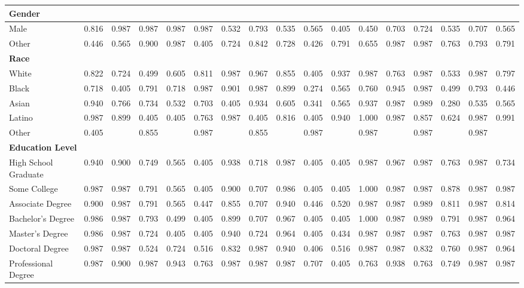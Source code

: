 \documentclass[11pt]{report}
\begin{document}
\begin{append}
\begin{landscape}
\begin{table}[h]
\begin{tabular}{@{\extracolsep{-4pt}}lcccccccccccccccc}
    \multicolumn{17}{l}{\textbf{Gender}} \\ 
    \midrule
    Male & 0.816 & 0.987 & 0.987 & 0.987 & 0.987 & 0.532 & 0.793 & 0.535 & 0.565 & 0.405 & 0.450 & 0.703 & 0.724 & 0.535 & 0.707 & 0.565 \\ 
    Other & 0.446 & 0.565 & 0.900 & 0.987 & 0.405 & 0.724 & 0.842 & 0.728 & 0.426 & 0.791 & 0.655 & 0.987 & 0.987 & 0.763 & 0.793 & 0.791 \\ 
    \midrule
    
    \multicolumn{17}{l}{\textbf{Race}} \\ 
    \midrule
    White & 0.822 & 0.724 & 0.499 & 0.605 & 0.811 & 0.987 & 0.967 & 0.855 & 0.405 & 0.937 & 0.987 & 0.763 & 0.987 & 0.533 & 0.987 & 0.797 \\ 
    Black & 0.718 & 0.405 & 0.791 & 0.718 & 0.987 & 0.901 & 0.987 & 0.899 & 0.274 & 0.565 & 0.760 & 0.945 & 0.987 & 0.499 & 0.793 & 0.446 \\ 
    Asian & 0.940 & 0.766 & 0.734 & 0.532 & 0.703 & 0.405 & 0.934 & 0.605 & 0.341 & 0.565 & 0.937 & 0.987 & 0.989 & 0.280 & 0.535 & 0.565 \\ 
    Latino & 0.987 & 0.899 & 0.405 & 0.405 & 0.763 & 0.987 & 0.405 & 0.816 & 0.405 & 0.940 & 1.000 & 0.987 & 0.857 & 0.624 & 0.987 & 0.991 \\ 
    Other & 0.405 &  & 0.855 &  & 0.987 &  & 0.855 &  & 0.987 &  & 0.987 &  & 0.987 &  & 0.987 &  \\ 
    \midrule
    
    \multicolumn{17}{l}{\textbf{Education Level}} \\ 
    \midrule
    High School Graduate & 0.940 & 0.900 & 0.749 & 0.565 & 0.405 & 0.938 & 0.718 & 0.987 & 0.405 & 0.405 & 0.987 & 0.967 & 0.987 & 0.763 & 0.987 & 0.734 \\ 
    Some College & 0.987 & 0.987 & 0.791 & 0.565 & 0.405 & 0.900 & 0.707 & 0.986 & 0.405 & 0.405 & 1.000 & 0.987 & 0.987 & 0.878 & 0.987 & 0.987 \\ 
    Associate Degree & 0.900 & 0.987 & 0.791 & 0.565 & 0.447 & 0.855 & 0.707 & 0.940 & 0.446 & 0.520 & 0.987 & 0.987 & 0.989 & 0.811 & 0.987 & 0.814 \\ 
    Bachelor's Degree & 0.986 & 0.987 & 0.793 & 0.499 & 0.405 & 0.899 & 0.707 & 0.967 & 0.405 & 0.405 & 1.000 & 0.987 & 0.989 & 0.791 & 0.987 & 0.964 \\ 
    Master's Degree & 0.986 & 0.987 & 0.724 & 0.405 & 0.405 & 0.940 & 0.724 & 0.964 & 0.405 & 0.434 & 0.987 & 0.987 & 0.987 & 0.763 & 0.987 & 0.987 \\ 
    Doctoral Degree & 0.987 & 0.987 & 0.524 & 0.724 & 0.516 & 0.832 & 0.987 & 0.940 & 0.406 & 0.516 & 0.987 & 0.987 & 0.832 & 0.760 & 0.987 & 0.964 \\ 
    Professional Degree & 0.987 & 0.900 & 0.987 & 0.943 & 0.763 & 0.987 & 0.987 & 0.987 & 0.707 & 0.405 & 0.763 & 0.938 & 0.763 & 0.749 & 0.987 & 0.987 \\ 
    \midrule
    

\end{tabular}
\end{table}
\end{landscape}
\end{append}
\end{document}
